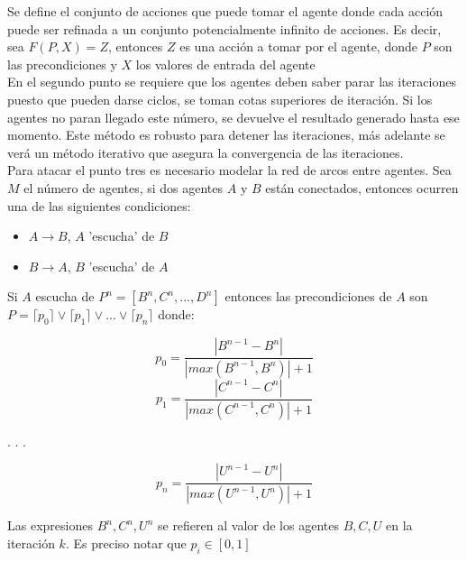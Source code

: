 \documentclass{article}
\begin{document}
        Se define el conjunto de acciones que puede tomar el agente donde cada acción puede ser refinada a un conjunto potencialmente infinito de acciones. Es decir, sea $F(P,X)=Z$, entonces $Z$ es una acción a tomar por el agente, donde $P$ son las precondiciones y $X$ los valores de entrada del agente \\

        En el segundo punto se requiere que los agentes deben saber parar las iteraciones puesto que pueden darse ciclos, se toman cotas superiores de iteración. Si los agentes no paran llegado este número, se devuelve el resultado generado hasta ese momento. Este método es robusto para detener las iteraciones, más adelante se verá un método iterativo que asegura la convergencia de las iteraciones. \\

        Para atacar el punto tres es necesario modelar la red de arcos entre agentes. Sea $M$ el número de agentes, si dos agentes $A$ y $B$ están conectados, entonces ocurren una de las siguientes condiciones:

        \begin{itemize}
            \item $A\rightarrow B$, $A$ 'escucha' de $B$
            \item  $B \rightarrow A$, $B$ 'escucha' de $A$
        \end{itemize}

        Si $A$ escucha de $P^n=[B^n,C^n,...,D^n]$ entonces las precondiciones de $A$ son $P=\lceil p_0 \rceil \lor \lceil p_1 \rceil \lor...\lor \lceil p_n \rceil$ donde:

        \begin{equation*}
            p_0=  \frac{|B^{n-1}-B^n|}{|max(B^{n-1},B^n)|+1}
        \end{equation*}
        \begin{equation*}
            p_1= \frac{|C^{n-1}-C^n|}{|max(C^{n-1},C^n)|+1}
        \end{equation*}
        \begin{center}
            .
            .
            .
        \end{center}

        \begin{equation*}
            p_n=  \frac{|U^{n-1}-U^n|}{|max(U^{n-1},U^n)|+1}
        \end{equation*}

        Las expresiones $B^n,C^n,U^n$ se refieren al valor de los agentes $B,C,U$ en la iteración $k$. Es preciso notar que $p_i \in [0,1]$ \\
\end{document}

